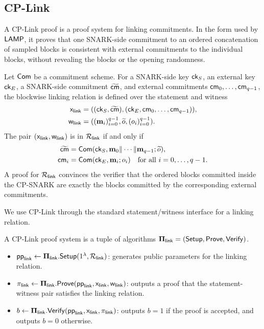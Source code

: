 \subsection{CP-Link}
\label{sec:prelim-cplink}

A CP-Link proof is a proof system for linking commitments.  In the form used by
\(\textsf{LAMP}\), it proves that one SNARK-side commitment to an ordered
concatenation of sampled blocks is consistent with external commitments to the
individual blocks, without revealing the blocks or the opening randomness.

Let ${\sf Com}$ be a commitment scheme.  For a SNARK-side key \({\textsf{ck}}_S\), an external
key \({\textsf{ck}}_E\), a SNARK-side commitment \(\widetilde{\textsf{cm}}\), and external
commitments \(\textsf{cm}_0,\ldots,\textsf{cm}_{q-1}\), the blockwise linking relation is
defined over the statement and witness
\[
\begin{aligned}
\mathsf{x}_{\mathsf{link}}
&=
(({\textsf{ck}}_S,\widetilde{\textsf{cm}}),
({\textsf{ck}}_E,\textsf{cm}_0,\ldots,\textsf{cm}_{q-1})),\\
\mathsf{w}_{\mathsf{link}}
&=
((\mathbf{m}_i)_{i=0}^{q-1},\widetilde{o},(o_i)_{i=0}^{q-1}).
\end{aligned}
\]
The pair \((\mathsf{x}_{\mathsf{link}},\mathsf{w}_{\mathsf{link}})\) is in
\({\mathcal{R}}_{\mathsf{link}}\) if and only if
\[
\begin{aligned}
\widetilde{\textsf{cm}}
&=
{\sf Com}({\textsf{ck}}_S,\mathbf{m}_0\|\cdots\|\mathbf{m}_{q-1};\widetilde{o}),\\
\textsf{cm}_i
&=
{\sf Com}({\textsf{ck}}_E,\mathbf{m}_i;o_i)
\quad \text{for all } i=0,\ldots,q-1.
\end{aligned}
\]
A proof for ${\mathcal{R}}_{\mathsf{link}}$ convinces the verifier that the ordered
blocks committed inside the CP-SNARK are exactly the blocks committed by the
corresponding external commitments.

We use CP-Link through the standard statement/witness interface for a linking
relation.

A CP-Link proof system is a tuple of algorithms
${\bf \Pi}_{\mathsf{link}}=({\sf Setup},{\sf Prove},{\sf Verify})$.

\begin{itemize}
\item $\textsf{pp}_{\mathsf{link}} \gets
{\bf \Pi}_{\mathsf{link}}.{\sf Setup}(1^\lambda,{\mathcal{R}}_{\mathsf{link}})$:
generates public parameters for the linking relation.

\item $\pi_{\mathsf{link}} \gets
{\bf \Pi}_{\mathsf{link}}.{\sf Prove}(
\textsf{pp}_{\mathsf{link}},
\mathsf{x}_{\mathsf{link}},
\mathsf{w}_{\mathsf{link}})$:
outputs a proof that the statement-witness pair satisfies the linking relation.

\item $b \gets
{\bf \Pi}_{\mathsf{link}}.{\sf Verify}(
\textsf{pp}_{\mathsf{link}},
\mathsf{x}_{\mathsf{link}},
\pi_{\mathsf{link}})$:
outputs $b=1$ if the proof is accepted, and outputs $b=0$ otherwise.
\end{itemize}

